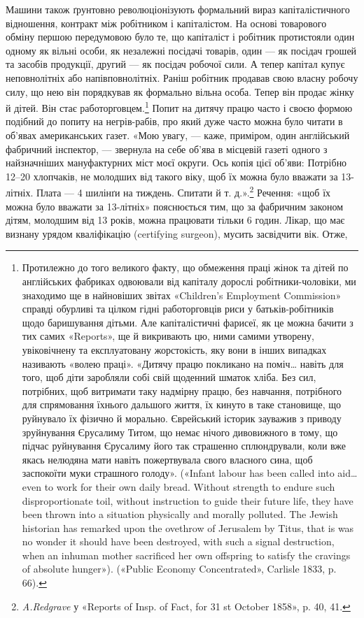 Машини також ґрунтовно революціонізують формальний вираз
капіталістичного відношення, контракт між робітником і капіталістом.
На основі товарового обміну першою передумовою було
те, що капіталіст і робітник протистояли один одному як вільні
особи, як незалежні посідачі товарів, один — як посідач грошей
та засобів продукції, другий — як посідач робочої сили. А тепер
капітал купує неповнолітніх або напівповнолітніх. Раніш
робітник продавав свою власну робочу силу, що нею він порядкував
як формально вільна особа. Тепер він продає жінку
й дітей. Він стає работорговцем.\footnote{
Протилежно до того великого факту, що обмеження праці жінок
та дітей по англійських фабриках одвоювали від капіталу дорослі робітники-чоловіки,
ми знаходимо ще в найновіших звітах «Children’s Employment
Commission» справді обурливі та цілком гідні работорговців риси
у батьків-робітників щодо баришування дітьми. Але капіталістичні
фарисеї, як це можна бачити з тих самих «Reports», ще й викривають цю,
ними самими утворену, увіковічнену та експлуатовану жорстокість, яку
вони в інших випадках називають «волею праці». «Дитячу працю покликано
на поміч\dots{} навіть для того, щоб діти заробляли собі свій щоденний
шматок хліба. Без сил, потрібних, щоб витримати таку надмірну
працю, без навчання, потрібного для спрямовання їхнього дальшого життя,
їх кинуто в таке становище, що руйнувало їх фізично й морально. Єврейський
історик зауважив з приводу зруйнування Єрусалиму Титом, що
немає нічого дивовижного в тому, що підчас руйнування Єрусалиму його
так страшенно сплюндрували, коли вже якась нелюдяна мати навіть пожертвувала
свого власного сина, щоб заспокоїти муки страшного голоду».
(«Infant labour has been called into aid\dots{} even to work for their own daily
bread. Without strength to endure such disproportionate toil, without
instruction to guide their future life, they have been thrown into a situation
physically and morally polluted. The Jewish historian has remarked upon
the ovethrow of Jerusalem by Titus, that is was no wonder it should have
been destroyed, with such a signal destruction, when an inhuman mother
sacrificed her own offspring to satisfy the cravings of absolute hunger»).
(«Public Economy Concentrated», Carlisle 1833, p. 66).
} Попит на дитячу працю
часто і своєю формою подібний до попиту на негрів-рабів,
про який дуже часто можна було читати в об’явах американських
газет. «Мою увагу, — каже, приміром, один англійський
фабричний інспектор, — звернула на себе об’ява в місцевій
газеті одного з найзначніших мануфактурних міст моєї округи.
Ось копія цієї об’яви: Потрібно 12--20 хлопчаків, не молодших
від такого віку, щоб їх можна було вважати за 13-літніх.
Плата — 4 шилінґи на тиждень. Спитати й т. д.».\footnote{
 \emph{A.Redgrave} у «Reports of Insp. of Fact, for 31 st October
1858», p. 40, 41.
} Речення:
«щоб їх можна було вважати за 13-літніх» пояснюється тим, що
за фабричним законом дітям, молодшим від 13 років, можна
працювати тільки 6 годин. Лікар, що має визнану урядом кваліфікацію
(certifying surgeon), мусить засвідчити вік. Отже,

\parbreak{}  %
